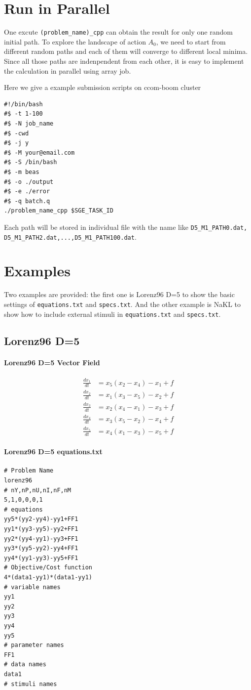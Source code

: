 \documentclass[11pt]{article}
\begin{document}
\section{Run in Parallel}
One excute \texttt{(problem\_name)\_cpp} can obtain the result for only one random initial path.
To explore the landscape of action $A_0$, we need to start from different random paths and each of them will converge to different local minima. Since all those paths are indenpendent from each other, it is easy to implement the calculation in parallel using array job.

Here we give a example submission scripts on ccom-boom cluster
\begin{verbatim}
#!/bin/bash
#$ -t 1-100
#$ -N job_name
#$ -cwd
#$ -j y
#$ -M your@email.com
#$ -S /bin/bash
#$ -m beas
#$ -o ./output
#$ -e ./error
#$ -q batch.q
./problem_name_cpp $SGE_TASK_ID
\end{verbatim}
Each path will be stored in individual file with the name like \texttt{D5\_M1\_PATH0.dat, D5\_M1\_PATH2.dat,...,D5\_M1\_PATH100.dat}.
\section{Examples}
Two examples are provided: the first one is Lorenz96 D=5 to show the basic settings of \texttt{equations.txt} and \texttt{specs.txt}. And the other example is NaKL to show how to include external stimuli in \texttt{equations.txt} and \texttt{specs.txt}.
\subsection{Lorenz96 D=5}
\paragraph{Lorenz96 D=5 Vector Field}
\begin{align*}
\frac{dx_1}{dt}&= x_5(x_2-x_4)-x_1+f\\
\frac{dx_2}{dt}&= x_1(x_3-x_5)-x_2+f\\
\frac{dx_3}{dt}&= x_2(x_4-x_1)-x_3+f\\
\frac{dx_4}{dt}&= x_3(x_5-x_2)-x_4+f\\
\frac{dx_5}{dt}&= x_4(x_1-x_3)-x_5+f
\end{align*}
\paragraph{Lorenz96 D=5 equations.txt}
\begin{verbatim}
# Problem Name
lorenz96
# nY,nP,nU,nI,nF,nM
5,1,0,0,0,1
# equations
yy5*(yy2-yy4)-yy1+FF1
yy1*(yy3-yy5)-yy2+FF1
yy2*(yy4-yy1)-yy3+FF1
yy3*(yy5-yy2)-yy4+FF1
yy4*(yy1-yy3)-yy5+FF1
# Objective/Cost function
4*(data1-yy1)*(data1-yy1)
# variable names
yy1
yy2
yy3
yy4
yy5
# parameter names
FF1
# data names
data1
# stimuli names
\end{verbatim}
\end{document}
